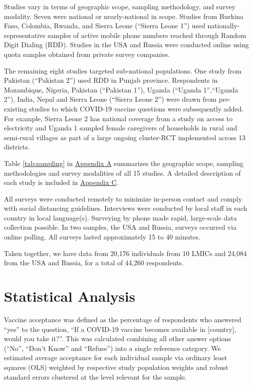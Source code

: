 \documentclass[
  12pt,
]{article}
\begin{document}
Studies vary in terms of geographic scope, sampling methodology, and survey modality. Seven were national or nearly-national in scope. Studies from Burkina Faso, Colombia, Rwanda, and Sierra Leone (``Sierra Leone 1'') used nationally-representative samples of active mobile phone numbers reached through Random Digit Dialing (RDD). Studies in the USA and Russia were conducted online using quota samples obtained from private survey companies.

The remaining eight studies targeted sub-national populations. One study from Pakistan (``Pakistan 2'') used RDD in Punjab province. Respondents in Mozambique, Nigeria, Pakistan (``Pakistan 1''), Uganda (``Uganda 1'',``Uganda 2''), India, Nepal and Sierra Leone (``Sierra Leone 2'') were drawn from pre-existing studies to which COVID-19 vaccine questions were subsequently added. For example, Sierra Leone 2 has national coverage from a study on access to electricity and Uganda 1 sampled female caregivers of households in rural and semi-rural villages as part of a large ongoing cluster-RCT implemented across 13 districts.

Table \ref{tab:sampling} in \protect\hyperlink{appendixd}{Appendix A} summarizes the geographic scope, sampling methodologies and survey modalities of all 15 studies. A detailed description of each study is included in \protect\hyperlink{appendixa}{Appendix C}.

All surveys were conducted remotely to minimize in-person contact and comply with social distancing guidelines. Interviews were conducted by local staff in each country in local language(s). Surveying by phone made rapid, large-scale data collection possible. In two samples, the USA and Russia, surveys occurred via online polling. All surveys lasted approximately 15 to 40 minutes.

Taken together, we have data from 20,176 individuals from 10 LMICs and 24,084 from the USA and Russia, for a total of 44,260 respondents.

\hypertarget{statistical-analysis}{%
\section*{Statistical Analysis}\label{statistical-analysis}}

Vaccine acceptance was defined as the percentage of respondents who answered ``yes'' to the question, ``If a COVID-19 vaccine becomes available in {[}country{]}, would you take it?''. This was calculated combining all other answer options (``No'', ``Don't Know'' and ``Refuse'') into a single reference category. We estimated average acceptance for each individual sample via ordinary least squares (OLS) weighted by respective study population weights and robust standard errors clustered at the level relevant for the sample.
\end{document}
